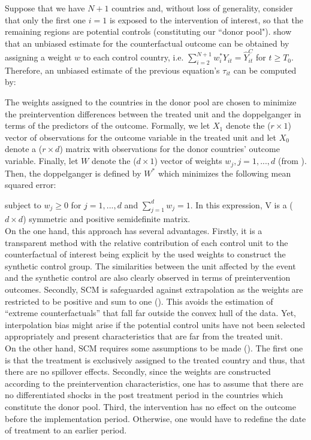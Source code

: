 \documentclass[11pt, a4paper, leqno]{article}
\begin{document}
Suppose that we have $N+1$ countries and, without loss of generality, consider that only the first one $i=1$ is exposed to the intervention of interest, so that the remaining regions are potential controls (constituting our ``donor pool"). \citet{Abadie2010} show that an unbiased estimate for the counterfactual outcome can be obtained by assigning a weight $w$ to each control country, i.e. $\sum_{i=2}^{N+1}w^*_i Y_{it} = \hat{Y}_{it}^C$ for $t\geq T_0$. Therefore, an unbiased estimate of the previous equation's $\tau_{it}$ can be computed by:

The weights assigned to the countries in the donor pool are chosen to minimize the preintervention differences between the treated unit and the doppelganger in terms of the predictors of the outcome. Formally, we let $X_1$ denote the ($r \times 1$) vector of observations for the outcome variable in the treated unit and let $X_0$ denote a ($r \times d$) matrix with observations for the donor countries' outcome variable. Finally, let $W$ denote the ($d \times 1$) vector of weights $w_j, j=1,...,d$ (from \citet{Born2018}). Then, the doppelganger is defined by $W^*$ which minimizes the following mean squared error: 

subject to $w_j \geq 0$ for $j=1,...,d$ and $\sum_{j=1}^{d}w_j = 1$. In this expression, V is a ($d \times d$) symmetric and positive semidefinite matrix.\\

On the one hand, this approach has several advantages. Firstly, it is a transparent method with the relative contribution of each control unit to the counterfactual of interest being explicit by the used weights to construct the synthetic control group. The similarities between the unit affected by the  event and the synthetic control are also clearly observed in terms of preintervention outcomes. Secondly, SCM is safeguarded against extrapolation as the weights are restricted to be positive and sum to one (\citet{Abadie2010}). This avoids the estimation of ``extreme counterfactuals” that fall far outside the convex hull of the data. Yet, interpolation bias might arise if the potential control units have not been selected appropriately and present characteristics that are far from the treated unit. \\

On the other hand, SCM requires some assumptions to be made (\citet{Abadie2010}). The first one is that the treatment is exclusively assigned to the treated country and thus, that there are no spillover effects. Secondly, since the weights are constructed according to the preintervention characteristics, one has to assume that there are no differentiated shocks in the post treatment period in the countries which constitute the donor pool. Third, the intervention has no effect on the outcome before the implementation period. Otherwise, one would have to redefine the date of treatment to an earlier period. \\
\end{document}
